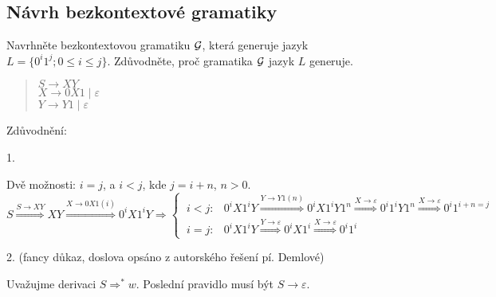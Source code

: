 \begin{multicols}{2}
        
        
\end{multicols}  

\subsection{Návrh bezkontextové gramatiky}
\noindent
Navrhněte bezkontextovou gramatiku $\mathcal{G}$, která generuje jazyk $L = \{0^i1^j ; 0 \leq i \leq j\}$.
Zdůvodněte, proč gramatika $\mathcal{G}$ jazyk $L$ generuje.
    
\begin{quote}
    $S \rightarrow XY$\\
    $X \rightarrow 0X1 \mid \varepsilon$\\
    $Y \rightarrow Y1 \mid \varepsilon$\\
\end{quote}

Zdůvodnění: 

1. 

Dvě možnosti: $ i = j$, a $i < j$, kde $j = i + n$, $n > 0$. 
\[
    S \stackrel{S \rightarrow XY}{\Longrightarrow} XY \stackrel{X \rightarrow 0X1 (i)}{\Longrightarrow} 0^i X 1^i Y  
    \Longrightarrow
\begin{cases}
    \ i < j:  & 0^i X 1^i Y \stackrel {Y \rightarrow Y1 (n)}{\Longrightarrow} 0^i X 1^i Y 1^n \stackrel{X \rightarrow 
    \varepsilon}{\Longrightarrow}0^i 1^i Y 1^n \stackrel{X \rightarrow \varepsilon}{\Longrightarrow} 0^i 1^{i+n = j} \\
    \ i = j: & 0^i X 1^i Y \stackrel{Y \rightarrow \varepsilon}{\Longrightarrow} 0^i X 1^i \stackrel{X \rightarrow 
    \varepsilon}{\Longrightarrow} 0^i 1^i
\end{cases}
\]

2. (fancy důkaz, doslova opsáno z autorského řešení pí. Demlové)

Uvažujme derivaci \( S \Rightarrow^* w \). Poslední pravidlo musí být \( S \rightarrow \varepsilon \).

